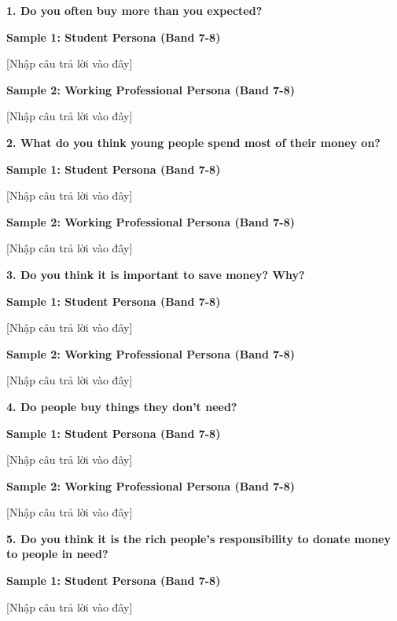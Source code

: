\partthreeheader

\begin{ieltsquestion}
\textbf{1. Do you often buy more than you expected?}
\end{ieltsquestion}
\textbf{Sample 1: Student Persona (Band 7-8)}

[Nhập câu trả lời vào đây]

\textbf{Sample 2: Working Professional Persona (Band 7-8)}

[Nhập câu trả lời vào đây]

\separator

\begin{ieltsquestion}
\textbf{2. What do you think young people spend most of their money on?}
\end{ieltsquestion}
\textbf{Sample 1: Student Persona (Band 7-8)}

[Nhập câu trả lời vào đây]

\textbf{Sample 2: Working Professional Persona (Band 7-8)}

[Nhập câu trả lời vào đây]

\separator

\begin{ieltsquestion}
\textbf{3. Do you think it is important to save money? Why?}
\end{ieltsquestion}
\textbf{Sample 1: Student Persona (Band 7-8)}

[Nhập câu trả lời vào đây]

\textbf{Sample 2: Working Professional Persona (Band 7-8)}

[Nhập câu trả lời vào đây]

\separator

\begin{ieltsquestion}
\textbf{4. Do people buy things they don't need?}
\end{ieltsquestion}
\textbf{Sample 1: Student Persona (Band 7-8)}

[Nhập câu trả lời vào đây]

\textbf{Sample 2: Working Professional Persona (Band 7-8)}

[Nhập câu trả lời vào đây]

\separator

\begin{ieltsquestion}
\textbf{5. Do you think it is the rich people's responsibility to donate money to people in need?}
\end{ieltsquestion}
\textbf{Sample 1: Student Persona (Band 7-8)}

[Nhập câu trả lời vào đây]

